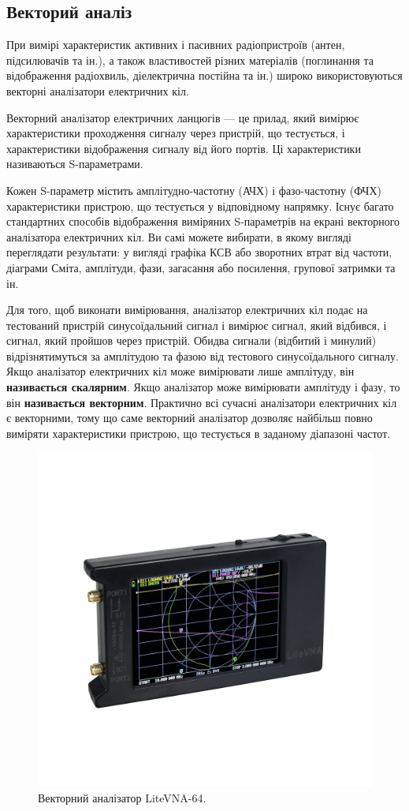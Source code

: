 \documentclass{article}
\begin{document}
\subsection{Векторий аналіз}

При вимірі характеристик активних і пасивних радіопристроїв (антен, підсилювачів та ін.), а також властивостей різних матеріалів (поглинання та відображення радіохвиль, діелектрична постійна та ін.) широко використовуються векторні аналізатори електричних кіл.

Векторний аналізатор електричних ланцюгів — це прилад, який вимірює характеристики проходження сигналу через пристрій, що тестується, і характеристики відображення сигналу від його портів. Ці характеристики називаються S-параметрами.

Кожен S-параметр містить амплітудно-частотну (АЧХ) і фазо-частотну (ФЧХ) характеристики пристрою, що тестується у відповідному напрямку. Існує багато стандартних способів відображення виміряних S-параметрів на екрані векторного аналізатора електричних кіл. Ви самі можете вибирати, в якому вигляді переглядати результати: у вигляді графіка КСВ або зворотних втрат від частоти, діаграми Сміта, амплітуди, фази, загасання або посилення, групової затримки та ін.


Для того, щоб виконати вимірювання, аналізатор електричних кіл подає на тестований пристрій синусоїдальний сигнал і вимірює сигнал, який відбився, і сигнал, який пройшов через пристрій. Обидва сигнали (відбитий і минулий) відрізнятимуться за амплітудою та фазою від тестового синусоїдального сигналу. Якщо аналізатор електричних кіл може вимірювати лише амплітуду, він \textbf{називається скалярним}. Якщо аналізатор може вимірювати амплітуду і фазу, то він \textbf{називається векторним}. Практично всі сучасні аналізатори електричних кіл є векторними, тому що саме векторний аналізатор дозволяє найбільш повно виміряти характеристики пристрою, що тестується в заданому діапазоні частот.

\begin{figure}[H]
\centering
\includegraphics[width=0.6\linewidth]{images/lite-vna.jpg}
\caption{\label{fig:lite-vna}Векторний аналізатор LiteVNA-64.}
\end{figure}
\end{document}
